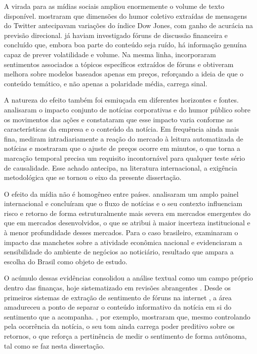 A virada para as mídias sociais ampliou enormemente o volume de texto disponível.  mostraram que dimensões do humor coletivo extraídas de mensagens do Twitter antecipavam variações do índice Dow Jones, com ganho de acurácia na previsão direcional.  já haviam investigado fóruns de discussão financeira e concluído que, embora boa parte do conteúdo seja ruído, há informação genuína capaz de prever volatilidade e volume. Na mesma linha,  incorporaram sentimentos associados a tópicos específicos extraídos de fóruns e obtiveram melhora sobre modelos baseados apenas em preços, reforçando a ideia de que o conteúdo temático, e não apenas a polaridade média, carrega sinal.

A natureza do efeito também foi esmiuçada em diferentes horizontes e fontes.  analisaram o impacto conjunto de notícias corporativas e do humor público sobre os movimentos das ações e constataram que esse impacto varia conforme as características da empresa e o conteúdo da notícia. Em frequência ainda mais fina,  mediram intradiariamente a reação do mercado à leitura automatizada de notícias e mostraram que o ajuste de preços ocorre em minutos, o que torna a marcação temporal precisa um requisito incontornável para qualquer teste sério de causalidade. Esse achado antecipa, na literatura internacional, a exigência metodológica que se tornou o eixo da presente dissertação.

O efeito da mídia não é homogêneo entre países.  analisaram um amplo painel internacional e concluíram que o fluxo de notícias e o seu contexto influenciam risco e retorno de forma estruturalmente mais severa em mercados emergentes do que em mercados desenvolvidos, o que se atribui à maior incerteza institucional e à menor profundidade desses mercados. Para o caso brasileiro,  examinaram o impacto das manchetes sobre a atividade econômica nacional e evidenciaram a sensibilidade do ambiente de negócios ao noticiário, resultado que ampara a escolha do Brasil como objeto de estudo.

O acúmulo dessas evidências consolidou a análise textual como um campo próprio dentro das finanças, hoje sistematizado em revisões abrangentes \cite{kearney_textual_2014, loughran_textual_2016}. Desde os primeiros sistemas de extração de sentimento de fóruns na internet \cite{das_yahoo_2007}, a área amadureceu a ponto de separar o conteúdo informativo da notícia em si do sentimento que a acompanha. , por exemplo, mostraram que, mesmo controlando pela ocorrência da notícia, o seu tom ainda carrega poder preditivo sobre os retornos, o que reforça a pertinência de medir o sentimento de forma autônoma, tal como se faz nesta dissertação.

